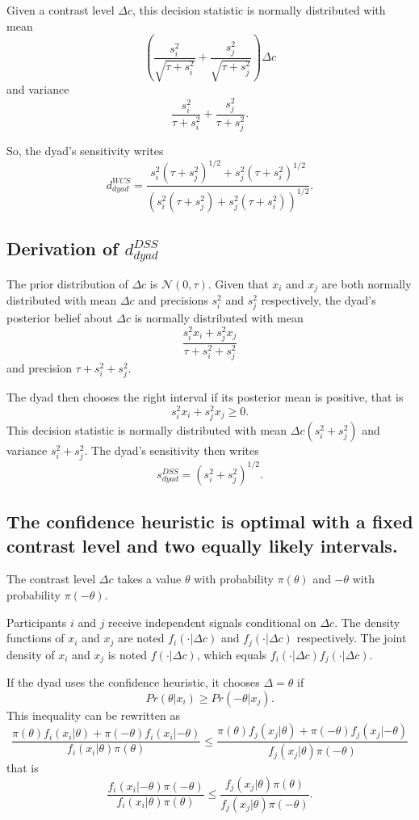 \documentclass[12pt]{article}
\begin{document}
Given a contrast level $\Delta c$, this decision statistic is normally distributed with mean $$(\frac{s_i^2}{\sqrt{\tau+s_i^2}} + \frac{s_j^2}{\sqrt{\tau+s_j^2}}) \Delta c $$ and variance $$  \frac{s_i^2}{\tau+s_i^2} + \frac{s_j^2}{\tau+s_j^2} .$$ 

So, the dyad's sensitivity writes $$ d_{dyad}^{WCS} = \frac{s_i^2(\tau+s_j^2)^{1/2}+s_j^2(\tau+s_i^2)^{1/2}}{(s_i^2(\tau+s_j^2)+s_j^2(\tau+s_i^2))^{1/2}}.$$

\subsection*{Derivation of $d_{dyad}^{DSS}$}

The prior distribution of $\Delta c$ is $\mathcal{N}(0,\tau)$. Given that $x_i$ and $x_j$ are both normally distributed with mean $\Delta c$ and precisions $s_i^2$ and $s_j^2$ respectively, the dyad's posterior belief about $\Delta c$ is normally distributed with mean $$\frac{s_i^2 x_i +s_j^2 x_j}{\tau + s_i^2 + s_j^2}$$ and precision $\tau + s_i^2 + s_j^2$.

The dyad then chooses the right interval if its posterior mean is positive, that is $$s_i^2 x_i +s_j^2 x_j \geq 0. $$ This decision statistic is normally distributed with mean $\Delta c (s_i^2 + s_j^2)$ and variance $ s_i^2 + s_j^2 $. The dyad's sensitivity then writes $$ s_{dyad}^{DSS} = ( s_i^2+s_j^2)^{1/2}.$$

\subsection*{The confidence heuristic is optimal with a fixed contrast level and two equally likely intervals.}
The contrast level $\Delta c$ takes a value $\theta$ with probability $\pi(\theta)$ and $-\theta$ with probability $\pi(-\theta)$. 

Participants $i$ and $j$ receive independent signals conditional on $\Delta c$. The density functions of $x_i$ and $x_j$ are noted $f_i(\cdot|\Delta c)$ and $f_j(\cdot|\Delta c)$ respectively. The joint density of $x_i$ and $x_j$ is noted $f(\cdot|\Delta c)$, which equals $f_i(\cdot|\Delta c) f_j(\cdot|\Delta c)$.

If the dyad uses the confidence heuristic, it chooses $\Delta = \theta$ if $$ Pr(\theta|x_i) \geq Pr(-\theta|x_j).$$ This inequality can be rewritten as $$ \frac{\pi(\theta) f_i(x_i|\theta) + \pi(-\theta)f_i(x_i|-\theta)}{f_i(x_i|\theta)\pi(\theta)} \leq \frac{\pi(\theta) f_j(x_j|\theta) + \pi(-\theta)f_j(x_j|-\theta)}{f_j(x_j|\theta)\pi(-\theta)}$$ that is  $$ \frac{f_i(x_i|-\theta)\pi(-\theta)}{f_i(x_i|\theta)\pi(\theta)} \leq \frac{ f_j(x_j|\theta) \pi(\theta)}{f_j(x_j|\theta)\pi(-\theta)}.$$
\end{document}
